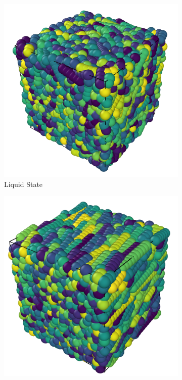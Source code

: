 \documentclass[11pt, a4paper]{article} %
\begin{document}
\begin{figure}[ht]
	\begin{subfigure}{.45\textwidth}
		\centering
		\includegraphics[width=\linewidth]{Figures/longrun_phasetrans2}  
		\caption{Liquid State}
		\label{fig:cubic_liquid}
	\end{subfigure}
	\hfill %
	\begin{subfigure}{.42\textwidth} %
		\centering
		\includegraphics[width=\linewidth]{Figures/longrun_phasetrans3}  

\end{subfigure}
\end{figure}
\end{document}
